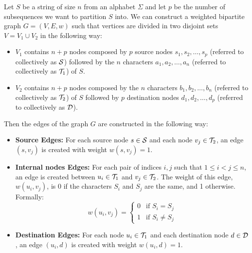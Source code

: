 \begin{definition} \label{def:bip_construction}
    Let $S$ be a string of size $n$ from an alphabet $\Sigma$ and let $p$ be the number of subsequences we want to partition $S$ into. 
    We can construct a weighted bipartite graph $G = (V,E,w)$ such that vertices are divided in two disjoint sets $V = V_1 \cup V_2$ in the following way:
    \begin{itemize}[leftmargin=25pt]
        \item $V_1$ contains $n+p$ nodes composed by $p$ source nodes $s_1,s_2,\dots,s_p$ (referred to collectively as $\mathcal{S}$) followed by the $n$ characters $a_1,a_2,\dots,a_n$ (referred to collectively as $\mathcal{T}_{1}$) of $S$.
        \item $V_2$ contains $n+p$ nodes composed by the $n$ characters $b_1,b_2,\dots,b_n$ (referred to collectively as $\mathcal{T}_{2}$) of $S$ followed by $p$ destination nodes $d_1,d_2,\dots,d_p$ (referred to collectively as $\mathcal{D}$).
    \end{itemize}
    Then the edges of the graph $G$ are constructed in the following way:
    \begin{itemize}[leftmargin=25pt]
        \item \textbf{Source Edges:} For each source node $s \in \mathcal{S}$ and each node $v_j \in \mathcal{T}_{2}$, an edge $(s, v_j)$ is created with weight $w(s, v_j) = 1$. 

        \item \textbf{Internal nodes Edges:} For each pair of indices $i, j$ such that $1 \le i < j \le n$, an edge is created between $u_i \in \mathcal{T}_{1}$ and $v_j \in \mathcal{T}_{2}$. The weight of this edge, $w(u_i, v_j)$, is 0 if the characters $S_i$ and $S_j$ are the same, and 1 otherwise. Formally:
        \[ w(u_i, v_j) = 
            \begin{cases} 
                0 & \text{if } S_i = S_j \\
                1 & \text{if } S_i \neq S_j 
            \end{cases}
        \]

        \item \textbf{Destination Edges:} For each node $u_i \in \mathcal{T}_{1}$ and each destination node $d \in \mathcal{D}$, an edge $(u_i, d)$ is created with weight $w(u_i, d) = 1$.
    \end{itemize}
\end{definition}

